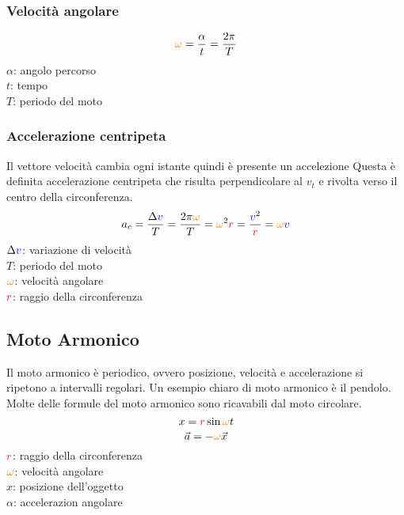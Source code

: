 \subsubsection{Velocità angolare}
\begin{equation*}
  \mathcolor{orange}{\omega} = \frac{\alpha}{t} = \frac{2\pi}{T}
\end{equation*}
$\alpha$: angolo percorso\\ 
$t$: tempo\\
$T$: periodo del moto

\subsubsection{Accelerazione centripeta}
Il vettore velocità cambia ogni istante quindi è presente un accelezione Questa è definita 
accelerazione centripeta che risulta perpendicolare al $v_t$ e rivolta verso il centro della 
circonferenza.
\begin{equation*}
  a_c = \frac{\Delta \mathcolor{blue}{v}}{T} = \frac{2\pi\mathcolor{orange}{\omega}}{T} = 
  \mathcolor{orange}{\omega}^2\mathcolor{red}{r} = \frac{\mathcolor{blue}{v}^2}{\mathcolor{red}{r}} = 
  \mathcolor{orange}{\omega}\mathcolor{blue}{v}
\end{equation*}
$\Delta\mathcolor{blue}{v}$: variazione di velocità\\
$T$: periodo del moto\\
$\mathcolor{orange}{\omega}$: velocità angolare\\
$\mathcolor{red}{r}$: raggio della circonferenza

\subsection{Moto Armonico}
Il moto armonico è periodico, ovvero posizione, velocità e accelerazione si ripetono a intervalli 
regolari. Un esempio chiaro di moto armonico è il pendolo.\\
Molte delle formule del moto armonico sono ricavabili dal moto circolare.
\begin{equation*}
  x = \mathcolor{red}{r}\sin\mathcolor{orange}{\omega}t
\end{equation*}
\begin{equation*}
  \vec{a} = -\mathcolor{orange}{\omega}\vec{x}
\end{equation*}
$\mathcolor{red}{r}$: raggio della circonferenza\\
$\mathcolor{orange}{\omega}$: velocità angolare\\
$x$: posizione dell'oggetto\\
$\alpha$: accelerazion angolare

